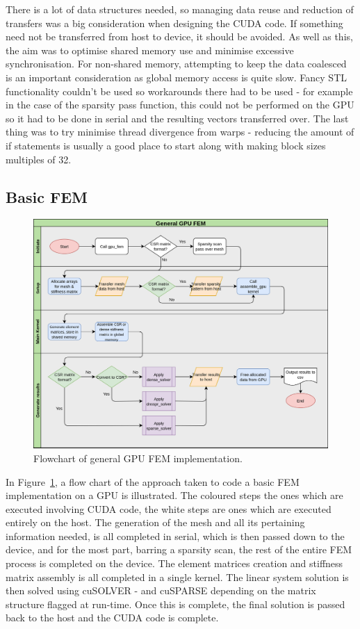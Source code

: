 There is a lot of data structures needed, so managing data reuse and reduction of transfers was a big consideration when designing the CUDA code. If something need not be transferred from host to device, it should be avoided. As well as this, the aim was to optimise shared memory use and minimise excessive synchronisation. For non-shared memory, attempting to keep the data coalesced is an important consideration as global memory access is quite slow. Fancy STL functionality couldn't be used so workarounds there had to be used - for example in the case of the sparsity pass function, this could not be performed on the GPU so it had to be done in serial and the resulting vectors transferred over. The last thing was to try minimise thread divergence from warps - reducing the amount of if statements is usually a good place to start along with making block sizes multiples of 32.

\subsection{Basic FEM}\label{basicfem}

\begin{figure}
	\centering
	\includegraphics[width = 0.9\linewidth]{Figures/gpu_flowchart}
	\caption{Flowchart of general GPU FEM implementation.}
	\label{fig:gpu_flow}
\end{figure}
In Figure~\ref{fig:gpu_flow}, a flow chart of the approach taken to code a basic FEM implementation on a GPU is illustrated. The coloured steps the ones which are executed involving CUDA code, the white steps are ones which are executed entirely on the host. The generation of the mesh and all its pertaining information needed, is all completed in serial, which is then passed down to the device, and for the most part, barring a sparsity scan, the rest of the entire FEM process is completed on the device. The element matrices creation and stiffness matrix assembly is all completed in a single kernel. The linear system solution is then solved using cuSOLVER - and cuSPARSE depending on the matrix structure flagged at run-time. Once this is complete, the final solution is passed back to the host and the CUDA code is complete.

